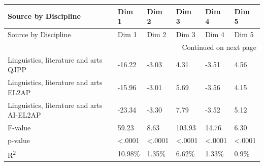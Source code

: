 \begin{longtable}[c]{p{5.5cm}p{1.25cm}p{1.25cm}p{1.25cm}p{1.25cm}p{1.25cm}}
\toprule
Source by Discipline & Dim 1 & Dim 2 & Dim 3 & Dim 4 & Dim 5 \\
\midrule
\endfirsthead
\toprule
Source by Discipline & Dim 1 & Dim 2 & Dim 3 & Dim 4 & Dim 5 \\
\midrule
\endhead
\midrule
\multicolumn{6}{r}{Continued on next page} \\
\midrule
\endfoot
\bottomrule
\endlastfoot
Linguistics, literature and arts QJPP & -16.22 & -3.03 & 4.31 & -3.51 & 4.56 \\
Linguistics, literature and arts EL2AP & -15.96 & -3.01 & 5.69 & -3.56 & 4.15 \\
Linguistics, literature and arts AI-EL2AP & -23.34 & -3.30 & 7.79 & -3.52 & 5.12 \\
\hline
F-value & 59.23 & 8.63 & 103.93 & 14.76 & 6.30 \\
p-value & <.0001 & <.0001 & <.0001 & <.0001 & <.0001 \\
R\textsuperscript{2} & 10.98\% & 1.35\% & 6.62\% & 1.33\% & 0.9\% \\
\end{longtable}
